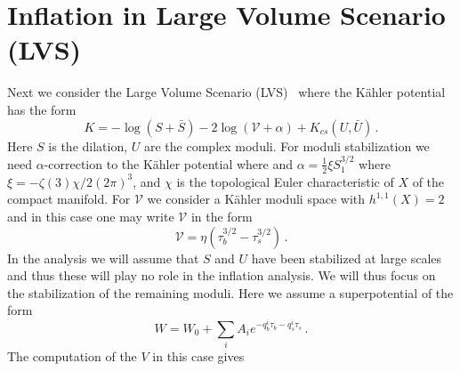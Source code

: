 \documentclass[12pt]{article}
\begin{document}
\section{Inflation in Large Volume Scenario (LVS) \label{sec:LVS}}
Next we consider the Large Volume Scenario (LVS)~\cite{Balasubramanian:2005zx} where the K\"ahler potential has the form
\begin{equation}
  K = - \log\left(S + \bar S\right)
      - 2 \log\left(\mathcal{V} + \alpha\right)
      + K_{cs}\left(U, \bar U\right)\,.
\end{equation}
Here $S$ is the dilation, $U$ are the complex moduli.
For moduli stabilization we need $\alpha$-correction to the K\"ahler potential where and $\alpha = \frac{1}{2} \xi S_1^{3 / 2}$ where $\xi = -\zeta\left(3\right) \chi / 2 \left(2 \pi\right)^3$, and $\chi$ is the topological Euler characteristic of $X$ of the compact manifold.
For $\mathcal{V}$ we consider a K\"ahler moduli space with $h^{1, 1}\left(X\right) = 2$ and in this case one may write $\mathcal{V}$ in the form
\begin{equation}
  \mathcal{V} = \eta \left(\tau_b^{3 / 2} - \tau_s^{3 / 2}\right)\,.
\end{equation}
In the analysis we will assume that $S$ and $U$ have been stabilized at large scales and thus these will play no role in the inflation analysis.
We will thus focus on the stabilization of the remaining moduli.
Here we assume a superpotential of the form
\begin{equation}
  W = W_0 + \sum_i A_i e^{-q^i_b \tau_b - q^i_s \tau_s}\,.
\end{equation}
The computation of the $V$ in this case gives
\end{document}
